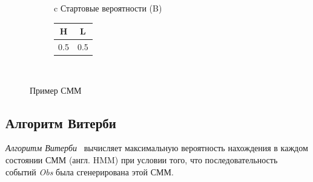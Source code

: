 \begin{figure}
\centering
	\begin{subfigure}{\textwidth}
		\centering
	\end{subfigure}
	\newline
	\vspace{1cm}
	\begin{subfigure}{\textwidth}
		\centering
		\begin{tabular}{c}
			Стартовые вероятности (B) \\
			\begin{tabular}{|c|c|}
				\hline
				H & L \\
				\hline
				0.5 & 0.5 \\
				\hline
			\end{tabular} \\
		\end{tabular}
		\vspace{0.3cm}
	\end{subfigure}
\caption{Пример СММ}
\label{fig:HMM}
\end{figure}


\subsection{Алгоритм Витерби}
\label{lab:Viterbi}
\emph{Алгоритм Витерби}~\cite{Viterbi} вычисляет максимальную вероятность нахождения в каждом состоянии СММ (англ. HMM) при условии того, что последовательность событий \emph{Obs} была сгенерирована этой СММ.

